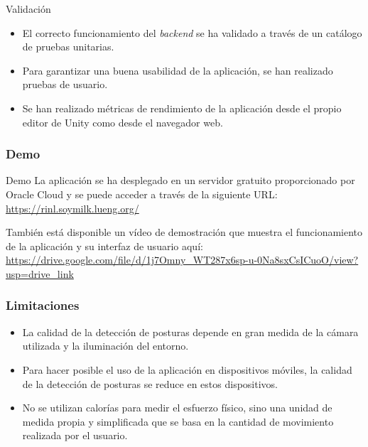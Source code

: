 \begin{frame}{Validación}
    \begin{itemize}
        \item El correcto funcionamiento del \textit{backend} se ha validado a
        través de un catálogo de \alert{pruebas unitarias}.

        \item Para garantizar una buena usabilidad de la aplicación, se han realizado
        \alert{pruebas de usuario}.

        \item Se han realizado \alert{métricas de rendimiento} de la aplicación
        desde el propio editor de Unity como desde el navegador web.
    \end{itemize}
\end{frame}

\begin{frame}
    \frametitle{Demo}

    \begin{block}{Demo}
        La aplicación se ha desplegado en un servidor gratuito proporcionado por
        Oracle Cloud y se puede acceder a través de la siguiente URL:
        \url{https://rinl.soymilk.lueng.org/}
    \end{block}

    También está disponible un vídeo de demostración que muestra el
    funcionamiento de la aplicación y su interfaz de usuario aquí:
    \url{https://drive.google.com/file/d/1j7Omny_WT287x6sp-u-0Na8sxCsICuoO/view?usp=drive_link}

\end{frame}

\begin{frame}
    \frametitle{Limitaciones}
    \begin{itemize}
        \item La calidad de la detección de posturas depende en gran medida de
        la \alert{cámara utilizada y la iluminación del entorno}.
        \pause

        \item Para hacer posible el uso de la aplicación en dispositivos
        móviles, \alert{la calidad de la detección de posturas se reduce} en
        estos dispositivos.
        \pause

        \item \alert{No se utilizan calorías} para medir el esfuerzo físico,
        sino una \alert{unidad de medida propia y simplificada} que se basa en
        la cantidad de movimiento realizada por el usuario.

    \end{itemize}
\end{frame}
